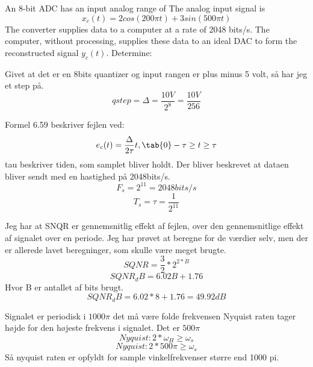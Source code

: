 \begin{Opgaver}
\begin{kapitel}
\begin{Opgave}
\begin{UnderOpgave}
            \end{UnderOpgave}
        \end{Opgave}

        \begin{Opgave}
            An 8-bit ADC has an input analog range of 
            The analog input signal is
            \[x_c(t) = 2cos(200\pi t) + 3sin(500\pi t)\]
            The converter supplies data to a computer at a rate of 2048 bits/s. The computer,
            without processing, supplies these data to an ideal DAC to form the reconstructed
            signal $y_c(t)$. Determine:
            \begin{UnderOpgave}
                Givet at det er en 8bits quantizer og input rangen er plus minus 5 volt, så har jeg et step på. 
                \[qstep = \Delta =  \frac{10V}{2^8} = \frac{10V}{256}\]

            \end{UnderOpgave}
            \begin{UnderOpgave}
                Formel 6.59 beskriver fejlen ved:
                \[e_c(t) = \frac{\Delta}{2\tau}t, \tab{0} -\tau \geq t \geq \tau\]
                tau beskriver tiden, som samplet bliver holdt.
                Der bliver beskrevet at dataen bliver sendt med en hastighed på 2048bits/s. 
                \[F_s = 2^11 = 2048bits/s\]
                \[T_s = \tau = \frac{1}{2^11}\]

                Jeg har at SNQR er gennemsnitlig effekt af fejlen, over den gennemsnitlige effekt af signalet over en periode. 
                Jeg har prøvet at beregne for de værdier selv, men der er allerede lavet beregninger, som skulle være meget brugte. 
                \[SQNR = \frac{3}{2} * 2^{2*B}\]
                \[SQNR_dB = 6.02B + 1.76\]
                Hvor B er antallet af bits brugt. 
                \[SQNR_dB = 6.02 * 8 + 1.76 = 49.92dB\]
            \end{UnderOpgave}

            \begin{UnderOpgave}
                Signalet er periodisk i $1000\pi$ det må være folde frekvensen
                Nyquist raten tager højde for den højeste frekvens i signalet. Det er $500\pi$
                \[Nyquist: 2*\omega_H \geq \omega_s\]
                \[Nyquist: 2*500\pi \geq \omega_s\]
                Så nyquist raten er opfyldt for sample vinkelfrekvenser større end 1000 pi. 


\end{UnderOpgave}
\end{Opgave}
\end{kapitel}
\end{Opgaver}
